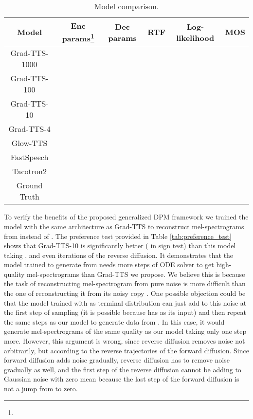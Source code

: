 \documentclass{article}
\begin{document}
\begin{table*}[ht]
\caption{Model comparison.}
\begin{center}
\begin{tabular}{|c|c|c|c|c|c|}
\hline
Model &Enc params\footnote{} &Dec params &RTF &Log-likelihood &MOS \\ \hline
Grad-TTS-1000 & \multirow{4}{*}{} & \multirow{4}{*}{} & & \multirow{4}{*}{} & \\ \cline{1-1}\cline{4-4}\cline{6-6}
Grad-TTS-100 & & & & & \\ \cline{1-1}\cline{4-4}\cline{6-6}
Grad-TTS-10 & & & & & \\ \cline{1-1}\cline{4-4}\cline{6-6}
Grad-TTS-4 & & & & & \\ \hline
Glow-TTS & & & & & \\ \hline
FastSpeech & \multicolumn{2}{c}{} \vline & & & \\ \hline
Tacotron2 & \multicolumn{2}{c}{} \vline & & & \\ \hline
Ground Truth & \multicolumn{2}{c}{} \vline & & & \\ \hline
\end{tabular}
\end{center}
\label{tab:main}
\end{table*}

To verify the benefits of the proposed generalized DPM framework we trained the model with the same architecture as Grad-TTS to reconstruct mel-spectrograms from  instead of . The preference test provided in Table \ref{tab:preference_test} shows that Grad-TTS-10 is significantly better ( in sign test) than this model taking ,  and even  iterations of the reverse diffusion. It demonstrates that the model trained to generate from  needs more steps of ODE solver to get high-quality mel-spectrograms than Grad-TTS we propose. We believe this is because the task of reconstructing mel-spectrogram from pure noise  is more difficult than the one of reconstructing it from its noisy copy . One possible objection could be that the model trained with  as terminal distribution can just add  to this noise at the first step of sampling (it is possible because  has  as its input) and then repeat the same steps as our model to generate data from . In this case, it would generate mel-spectrograms of the same quality as our model taking only one step more. However, this argument is wrong, since reverse diffusion removes noise not arbitrarily, but according to the reverse trajectories of the forward diffusion. Since forward diffusion adds noise gradually, reverse diffusion has to remove noise gradually as well, and the first step of the reverse diffusion cannot be adding  to Gaussian noise with zero mean because the last step of the forward diffusion is not a jump from  to zero.
\end{document}

